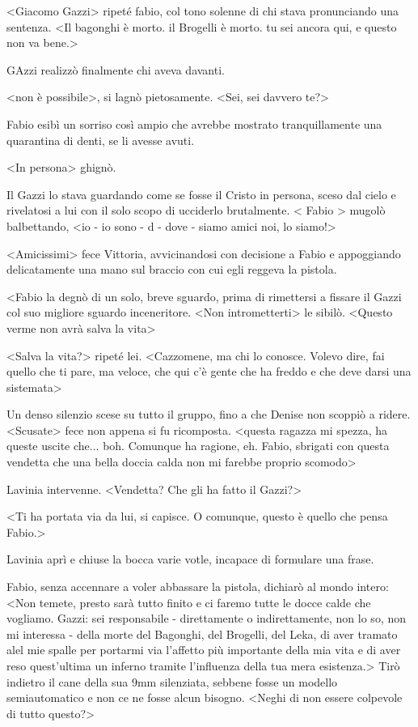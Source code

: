 <Giacomo Gazzi> ripeté fabio, col tono solenne di chi stava pronunciando una sentenza. <Il bagonghi è morto. il Brogelli è morto. tu sei ancora qui, e questo non va bene.> 

GAzzi realizzò finalmente chi aveva davanti.

<non è possibile>, si lagnò pietosamente. <Sei, sei davvero te?>

Fabio esibì un sorriso così ampio che avrebbe mostrato tranquillamente una quarantina di denti, se li avesse avuti.

<In persona> ghignò.

Il Gazzi lo stava guardando come se fosse il Cristo in persona, sceso dal cielo e rivelatosi a lui con il solo scopo di ucciderlo brutalmente. < Fabio > mugolò balbettando, <io - io sono - d - dove - siamo amici noi, lo siamo!>

<Amicissimi> fece Vittoria, avvicinandosi con decisione a Fabio e appoggiando delicatamente una mano sul braccio con cui egli reggeva la pistola.

<Fabio la degnò di un solo, breve sguardo, prima di rimettersi a fissare il Gazzi col suo migliore sguardo inceneritore. <Non intrometterti> le sibilò. <Questo verme non avrà salva la vita>

<Salva la vita?> ripeté lei. <Cazzomene, ma chi lo conosce. Volevo dire, fai quello che ti pare, ma veloce, che qui c'è gente che ha freddo e che deve darsi una sistemata>

Un denso silenzio scese su tutto il gruppo, fino a che Denise non scoppiò a ridere. <Scusate> fece non appena si fu ricomposta. <questa ragazza mi spezza, ha queste uscite che... boh. Comunque ha ragione, eh. Fabio, sbrigati con questa vendetta che una bella doccia calda non mi farebbe proprio scomodo>

Lavinia intervenne. <Vendetta? Che gli ha fatto il Gazzi?>

<Ti ha portata via da lui, si capisce. O comunque, questo è quello che pensa Fabio.> 

Lavinia aprì e chiuse la bocca varie votle, incapace di formulare una frase.

Fabio, senza accennare a voler abbassare la pistola, dichiarò al mondo intero: <Non temete, presto sarà tutto finito e ci faremo tutte le docce calde che vogliamo. Gazzi: sei responsabile - direttamente o indirettamente, non lo so, non mi interessa - della morte del Bagonghi, del Brogelli, del Leka, di aver tramato alel mie spalle per portarmi via l'affetto più importante della mia vita e di aver reso quest'ultima un inferno tramite l'influenza della tua mera esistenza.> Tirò indietro il cane della sua 9mm silenziata, sebbene fosse un modello semiautomatico e non ce ne fosse alcun bisogno. <Neghi di non essere colpevole di tutto questo?>

